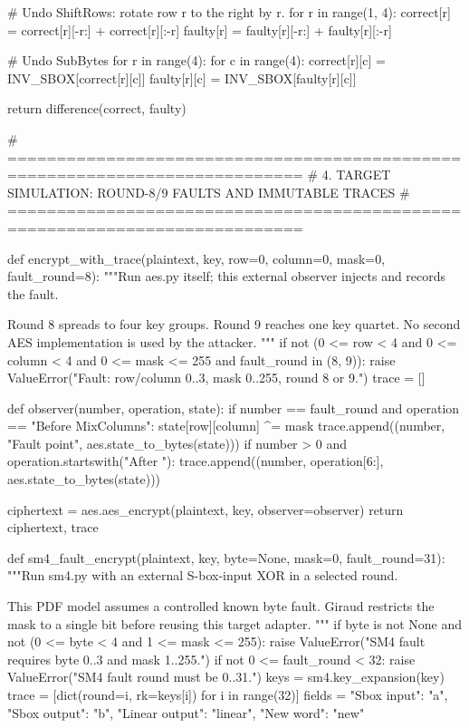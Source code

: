 \begin{lightcode}[numbers=left,firstnumber=1]
    # Undo ShiftRows: rotate row r to the right by r.
    for r in range(1, 4):
        correct[r] = correct[r][-r:] + correct[r][:-r]
        faulty[r] = faulty[r][-r:] + faulty[r][:-r]

    # Undo SubBytes
    for r in range(4):
        for c in range(4):
            correct[r][c] = INV_SBOX[correct[r][c]]
            faulty[r][c] = INV_SBOX[faulty[r][c]]

    return difference(correct, faulty)


# ============================================================================
# 4. TARGET SIMULATION: ROUND-8/9 FAULTS AND IMMUTABLE TRACES
# ============================================================================


def encrypt_with_trace(plaintext, key, row=0, column=0, mask=0, fault_round=8):
    """Run aes.py itself; this external observer injects and records the fault.

    Round 8 spreads to four key groups. Round 9 reaches one key quartet.
    No second AES implementation is used by the attacker.
    """
    if not (0 <= row < 4 and 0 <= column < 4 and 0 <= mask <= 255 and fault_round in (8, 9)):
        raise ValueError("Fault: row/column 0..3, mask 0..255, round 8 or 9.")
    trace = []

    def observer(number, operation, state):
        if number == fault_round and operation == "Before MixColumns":
            state[row][column] ^= mask
            trace.append((number, "Fault point", aes.state_to_bytes(state)))
        if number > 0 and operation.startswith("After "):
            trace.append((number, operation[6:], aes.state_to_bytes(state)))

    ciphertext = aes.aes_encrypt(plaintext, key, observer=observer)
    return ciphertext, trace


def sm4_fault_encrypt(plaintext, key, byte=None, mask=0, fault_round=31):
    """Run sm4.py with an external S-box-input XOR in a selected round.

    This PDF model assumes a controlled known byte fault. Giraud restricts the
    mask to a single bit before reusing this target adapter.
    """
    if byte is not None and not (0 <= byte < 4 and 1 <= mask <= 255):
        raise ValueError("SM4 fault requires byte 0..3 and mask 1..255.")
    if not 0 <= fault_round < 32:
        raise ValueError("SM4 fault round must be 0..31.")
    keys = sm4.key_expansion(key)
    trace = [dict(round=i, rk=keys[i]) for i in range(32)]
    fields = {"Sbox input": "a", "Sbox output": "b", "Linear output": "linear", "New word": "new"}


\end{lightcode}
